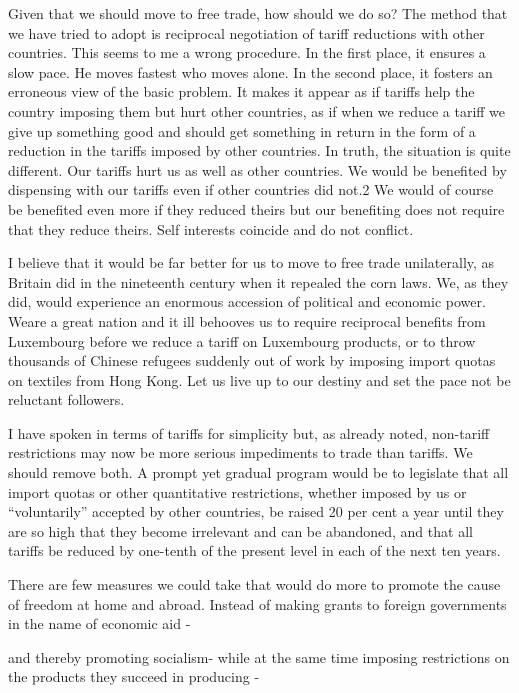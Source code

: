 \documentclass[11pt,openany]{book}
\begin{document}
Given that we should move to free trade, how should we do so? The method that we have tried to adopt is reciprocal negotiation of tariff reductions with other countries. This seems to me a wrong procedure. In the first place, it ensures a slow pace. He moves fastest who moves alone. In the second place, it fosters an erroneous view of the basic problem. It makes it appear as if tariffs help the country imposing them but hurt other countries, as if when we reduce a tariff we give up something good and should get something in return in the form of a reduction in the tariffs imposed by other countries. In truth, the situation is quite different. Our tariffs hurt us as well as other countries. We would be benefited by dispensing with our tariffs even if other countries did not.2 We would of course be benefited even more if they reduced theirs but our benefiting does not require that they reduce theirs. Self interests coincide and do not conflict.

I believe that it would be far better for us to move to free trade unilaterally, as Britain did in the nineteenth century when it repealed the corn laws. We, as they did, would experience an enormous accession of political and economic power. Weare a great nation and it ill behooves us to require reciprocal benefits from Luxembourg before we reduce a tariff on Luxembourg products, or to throw thousands of Chinese refugees suddenly out of work by imposing import quotas on textiles from Hong Kong. Let us live up to our destiny and set the pace not be reluctant followers.

I have spoken in terms of tariffs for simplicity but, as already noted, non-tariff restrictions may now be more serious impediments to trade than tariffs. We should remove both. A prompt yet gradual program would be to legislate that all import quotas or other quantitative restrictions, whether imposed by us or ``voluntarily'' accepted by other countries, be raised 20 per cent a year until they are so high that they become irrelevant and can be abandoned, and that all tariffs be reduced by one-tenth of the present level in each of the next ten years.

There are few measures we could take that would do more to promote the cause of freedom at home and abroad. Instead of making grants to foreign governments in the name of economic aid -

and thereby promoting socialism- while at the same time imposing restrictions on the products they succeed in producing -
\end{document}
